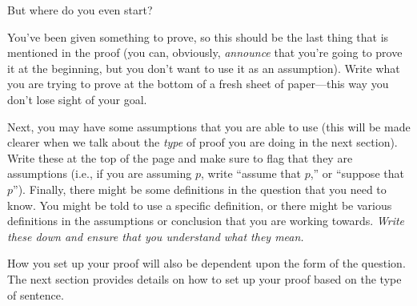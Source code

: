 \documentclass[../../../include/open-logic-section]{subfiles}
\begin{document}


But where do you even start?

You've been given something to prove, so this should be the last thing that
is mentioned in the proof (you can, obviously, \emph{announce} that you're
going to prove it at the beginning, but you don't want to use it as an
assumption). Write what you are trying to prove at the bottom of a fresh
sheet of paper---this way you don't lose sight of your goal.

Next, you may have some assumptions that you are able to use (this
will be made clearer when we talk about the \emph{type} of proof you
are doing in the next section). Write these at the top of the page and
make sure to flag that they are assumptions (i.e., if you are assuming
$p$, write ``assume that $p$,'' or ``suppose that $p$''). Finally,
there might be some definitions in the question that you need to know.
You might be told to use a specific definition, or there might be
various definitions in the assumptions or conclusion that you are
working towards. \emph{Write these down and ensure that you understand
what they mean.}

How you set up your proof will also be dependent upon the form of the
question. The next section provides details on how to set up your proof
based on the type of sentence.
\end{document}
